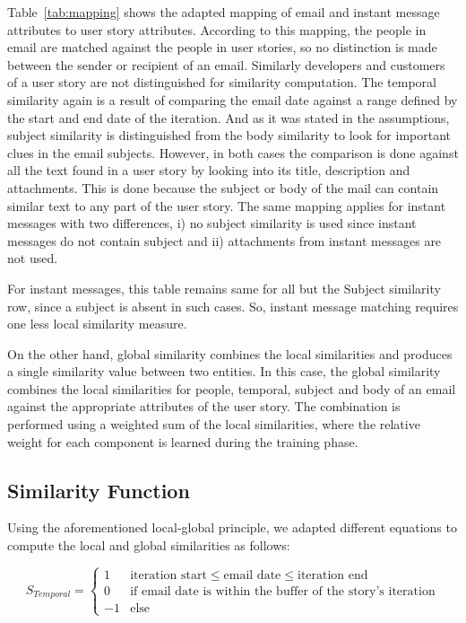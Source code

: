 Table~\ref{tab:mapping} shows the adapted mapping of email and instant message attributes to user story attributes. According to this mapping, the people in email are matched against the people in user stories, so no distinction is made between the sender or recipient of an email. Similarly developers and customers of a user story are not distinguished for similarity computation. The temporal similarity again is a result of comparing the email date against a range defined by the start and end date of the iteration. And as it was stated in the assumptions, subject similarity is distinguished from the body similarity to look for important clues in the email subjects. However, in both cases the comparison is done against all the text found in a user story by looking into its title, description and attachments. This is done because the subject or body of the mail can contain similar text to any part of the user story. The same mapping applies for instant messages with two differences, i) no subject similarity is used since instant messages do not contain subject and ii) attachments from instant messages are not used.

For instant messages, this table remains same for all but the Subject similarity row, since a subject is absent in such cases. So, instant message matching requires one less local similarity measure.

On the other hand, global similarity combines the local similarities and produces a single similarity value between two entities. In this case, the global similarity combines the local similarities for people, temporal, subject and body of an email against the appropriate attributes of the user story. The combination is performed using a weighted sum of the local similarities, where the relative weight for each component is learned during the training phase.

\subsection{Similarity Function}
\label{sec:equations}
Using the aforementioned local-global principle, we adapted different equations to compute the local and global similarities as follows:

\begin{equation}
\label{eq:temporal}
S_{Temporal} =
\begin{cases}
1 & \mbox{iteration start} \le \mbox{email date} \le \mbox{iteration end}\\
0 & \mbox{if email date is within the buffer of the story's iteration} \\
-1 & \mbox{else}
\end{cases}
\end{equation}

